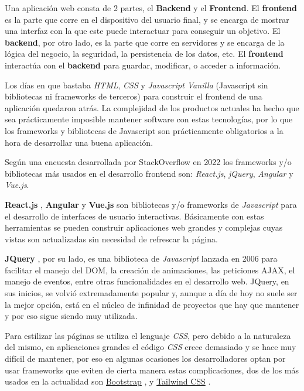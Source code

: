 Una aplicación web consta de 2 partes, el \textbf{Backend} y el \textbf{Frontend}. El \textbf{frontend} es la parte que corre en el dispositivo del usuario final, y se encarga de mostrar una interfaz con la que este puede interactuar para conseguir un objetivo. El \textbf{backend}, por otro lado, es la parte que corre en servidores y se encarga de la lógica del negocio, la seguridad, la persistencia de los datos, etc. El \textbf{frontend} interactúa con el \textbf{backend} para guardar, modificar, o acceder a información.
\newline

Los días en que bastaba \textit{HTML}, \textit{CSS} y \textit{Javascript Vanilla} (Javascript sin bibliotecas ni frameworks de terceros) para construir el frontend de una aplicación quedaron atrás. La complejidad de los productos actuales ha hecho que sea prácticamente imposible mantener software con estas tecnologías, por lo que los frameworks y bibliotecas de Javascript son prácticamente obligatorios a la hora de desarrollar una buena aplicación.
\newline

Según una encuesta desarrollada por StackOverflow \cite{encuesta2022} en 2022 los frameworks y/o bibliotecas más usados en el desarrollo frontend son: \textit{React.js}, \textit{jQuery}, \textit{Angular} y \textit{Vue.js}.
\newline

\textbf{React.js} \cite{react}, \textbf{Angular} \cite{angular} y \textbf{Vue.js} \cite{vue} son bibliotecas y/o frameworks de \textit{Javascript} para el desarrollo de interfaces de usuario interactivas. Básicamente con estas herramientas se pueden construir aplicaciones web grandes y complejas cuyas vistas son actualizadas sin necesidad de refrescar la página.
\newline

\textbf{JQuery} \cite{jquery}, por su lado, es una biblioteca de \textit{Javascript} lanzada en 2006 para facilitar el manejo del DOM, la creación de animaciones, las peticiones AJAX, el manejo de eventos, entre otras funcionalidades en el desarrollo web. JQuery, en sus inicios, se volvió extremadamente popular y, aunque a día de hoy no suele ser la mejor opción, está en el núcleo de infinidad de proyectos que hay que mantener y por eso sigue siendo muy utilizada.
\newline

Para estilizar las páginas se utiliza el lenguaje \textit{CSS}, pero debido a la naturaleza del mismo, en aplicaciones grandes el código \textit{CSS} crece demasiado y se hace muy difícil de mantener, por eso en algunas ocasiones los desarrolladores optan por usar frameworks que eviten de cierta manera estas complicaciones, dos de los más usados en la actualidad son \href{getbootstrap.com}{Bootstrap} \cite{bootstrap}, y \href{tailwindcss.com}{Tailwind CSS} \cite{tailwind}.
\newline


